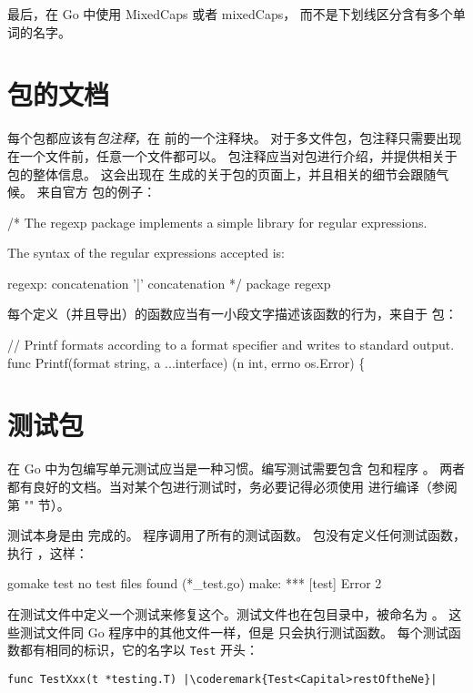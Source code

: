 最后，在 Go 中使用 MixedCaps 或者 mixedCaps，
而不是下划线区分含有多个单词的名字。


\section{包的文档}
每个包都应该有\emph{包注释}，在  前的一个注释块。
对于多文件包，包注释只需要出现在一个文件前，任意一个文件都可以。
包注释应当对包进行介绍，并提供相关于包的整体信息。
这会出现在  生成的关于包的页面上，并且相关的细节会跟随气候。
来自官方  包的例子：
\begin{display}
/*
    The regexp package implements a simple library for
    regular expressions.

    The syntax of the regular expressions accepted is:

    regexp:
        concatenation { '|' concatenation }
*/
package regexp
\end{display}

每个定义（并且导出）的函数应当有一小段文字描述该函数的行为，来自于
  包：
\begin{display}
// Printf formats according to a format specifier and writes to standard output.
func Printf(format string, a ...interface{}) (n int, errno os.Error) \{
\end{display}

\section{测试包}
在 Go 中为包编写单元测试应当是一种习惯。编写测试需要包含
 包和程序 。
两者都有良好的文档。当对某个包进行测试时，务必要记得必须使用
 进行编译（参阅第 "" 节）。



测试本身是由  完成的。
 程序调用了所有的测试函数。
 包没有定义任何测试函数，执行 ，这样：
\begin{display}
\pr gomake test
no test files found (*_test.go)
make: *** [test] Error 2
\end{display}
在测试文件中定义一个测试来修复这个。测试文件也在包目录中，被命名为 。
这些测试文件同 Go 程序中的其他文件一样，但是  只会执行测试函数。
每个测试函数都有相同的标识，它的名字以 \lstinline{Test} 开头：
\begin{lstlisting}
func TestXxx(t *testing.T) |\coderemark{Test<Capital>restOftheNe}|
\end{lstlisting}

